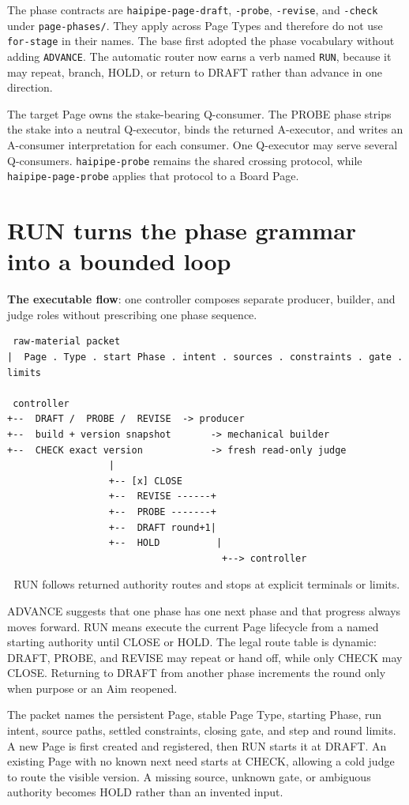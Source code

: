 The phase contracts are \texttt{haipipe-page-draft}, \texttt{-probe}, \texttt{-revise}, and \texttt{-check} under \texttt{page-phases/}. They apply across Page Types and therefore do not use \texttt{for-stage} in their names. The base first adopted the phase vocabulary without adding \texttt{ADVANCE}. The automatic router now earns a verb named \texttt{RUN}, because it may repeat, branch, HOLD, or return to DRAFT rather than advance in one direction.

The target Page owns the stake-bearing Q-consumer. The PROBE phase strips the stake into a neutral Q-executor, binds the returned A-executor, and writes an A-consumer interpretation for each consumer. One Q-executor may serve several Q-consumers. \texttt{haipipe-probe} remains the shared crossing protocol, while \texttt{haipipe-page-probe} applies that protocol to a Board Page.


\section{RUN turns the phase grammar into a bounded loop}
\textbf{The executable flow}: one controller composes separate producer, builder, and judge roles without prescribing one phase sequence.

\begin{verbatim}
 raw-material packet
|  Page . Type . start Phase . intent . sources . constraints . gate . limits

 controller
+--  DRAFT /  PROBE /  REVISE  -> producer
+--  build + version snapshot       -> mechanical builder
+--  CHECK exact version            -> fresh read-only judge
                  |
                  +-- [x] CLOSE
                  +--  REVISE ------+
                  +--  PROBE -------+
                  +--  DRAFT round+1|
                  +--  HOLD          |
                                      +--> controller
\end{verbatim}
📌 RUN follows returned authority routes and stops at explicit terminals or limits.

ADVANCE suggests that one phase has one next phase and that progress always moves forward. RUN means execute the current Page lifecycle from a named starting authority until CLOSE or HOLD. The legal route table is dynamic: DRAFT, PROBE, and REVISE may repeat or hand off, while only CHECK may CLOSE. Returning to DRAFT from another phase increments the round only when purpose or an Aim reopened.

The packet names the persistent Page, stable Page Type, starting Phase, run intent, source paths, settled constraints, closing gate, and step and round limits. A new Page is first created and registered, then RUN starts it at DRAFT. An existing Page with no known next need starts at CHECK, allowing a cold judge to route the visible version. A missing source, unknown gate, or ambiguous authority becomes HOLD rather than an invented input.


